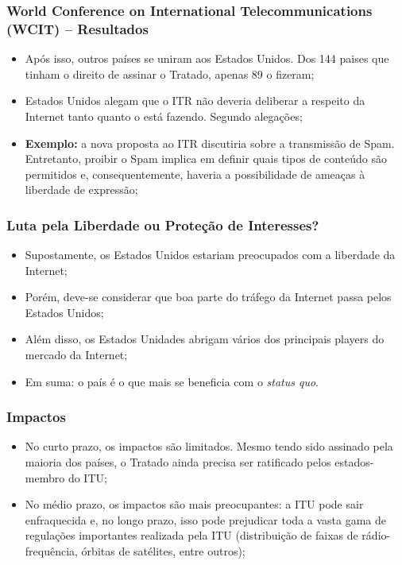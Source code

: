 \documentclass{beamer}
\begin{document}
\begin{frame}
\frametitle{World Conference on International Telecommunications (WCIT) -- Resultados}
\begin{itemize}
\item Após isso, outros países se uniram aos Estados Unidos. Dos 144 paises que tinham o direito de assinar o Tratado, apenas 89 o fizeram;
\item Estados Unidos alegam que o ITR não deveria deliberar a respeito da Internet tanto quanto o está fazendo. Segundo alegações;
\item \textbf{Exemplo:} a nova proposta ao ITR discutiria sobre a transmissão de Spam. Entretanto, proibir o Spam implica em definir quais tipos de conteúdo são permitidos e, consequentemente, haveria a possibilidade de ameaças à liberdade de expressão;
\end{itemize}
\end{frame}


\begin{frame}
\frametitle{Luta pela Liberdade ou Proteção de Interesses?}
\begin{itemize}
\item Supostamente, os Estados Unidos estariam preocupados com a liberdade da Internet;
\item Porém, deve-se considerar que boa parte do tráfego da Internet passa pelos Estados Unidos;
\item Além disso, os Estados Unidades abrigam vários dos principais players do mercado da Internet;
\item Em suma: o país é o que mais se beneficia com o \emph{status quo}.
\end{itemize}
\end{frame}


\begin{frame}
\frametitle{Impactos}
\begin{itemize}
\item No curto prazo, os impactos são limitados. Mesmo tendo sido assinado pela maioria dos países, o Tratado ainda precisa ser ratificado pelos estados-membro do ITU;
\item No médio prazo, os impactos são mais preocupantes: a ITU pode sair enfraquecida e, no longo prazo, isso pode prejudicar toda a vasta gama de regulações importantes realizada pela ITU (distribuição de faixas de rádio-frequência, órbitas de satélites, entre outros);
\end{itemize}
\end{frame}
\end{document}
